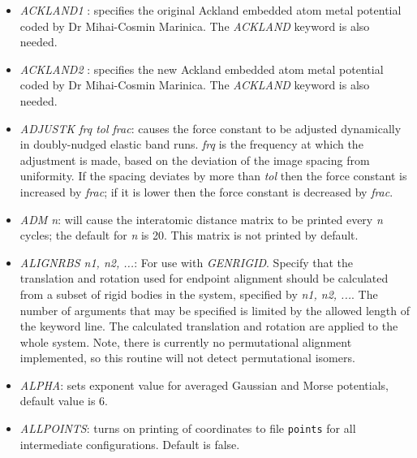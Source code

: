 \documentclass[12pt,a4paper,dvips]{article}
\begin{document}
\begin{itemize}
\item {\it ACKLAND1 \/}: specifies the original Ackland embedded atom metal potential %
coded by Dr Mihai-Cosmin Marinica. The {\it ACKLAND} keyword is also needed.

\item {\it ACKLAND2 \/}: specifies the new Ackland embedded atom metal potential %
coded by Dr Mihai-Cosmin Marinica. The {\it ACKLAND} keyword is also needed.

\item {\it ADJUSTK frq tol frac\/}: causes the force constant to be adjusted
dynamically in doubly-nudged elastic band runs. 
{\it frq} is the frequency at which the adjustment is made, based on the
deviation of the image spacing from uniformity. If the spacing deviates
by more than {\it tol\/} then the force constant is increased by
{\it frac\/}; if it is lower then the force constant is decreased by
{\it frac\/}.

\item {\it ADM n}: will cause the
interatomic distance matrix to be printed every {\it n\/} cycles;
the default for {\it n\/} is 20. This matrix is not printed by default.

\item {\it ALIGNRBS n1, n2, ...}: For use with {\it GENRIGID}. Specify that the translation and rotation used for
endpoint alignment should be calculated from a subset of rigid bodies in the system, specified by {\it n1, n2, ...}.
The number of arguments that may be specified is limited by the allowed length of the keyword line.
The calculated translation and rotation are applied to the whole system. Note, there is currently no permutational
alignment implemented, so this routine will not detect permutational isomers.

\item {\it ALPHA}: sets exponent value for averaged Gaussian and Morse potentials,
default value is 6.

\item {\it ALLPOINTS}: turns on printing of coordinates to file {\tt points} for
all intermediate configurations. Default is false.



\end{itemize}
\end{document}
